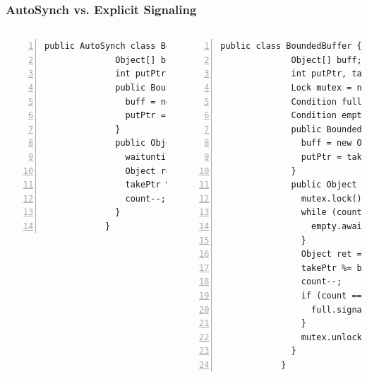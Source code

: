 \documentclass[mathserif,14pt,xcolor=table]{beamer}
\begin{document}
\begin{frame}[fragile]
    \frametitle{AutoSynch vs. Explicit Signaling}

    \begin{columns}
        \begin{lstlisting}[style=tinybase, gobble=8, numbers=left,
            numbersep=-10pt]
            public AutoSynch class BoundedBuffer {
              Object[] buff;
              int putPtr, takePtr, count;
              public BoundedBuffer(int n) {
                buff = new Object[n];
                putPtr = takePtr = count = 0 ;
              }
              public Object take() {
                waituntil (count > 0);
                Object ret = buff[takePtr++];
                takePtr %= buff.length;
                count--;
              }
            }
        \end{lstlisting}
        \begin{lstlisting}[style=tinybase, gobble=8, numbers=left,
            numbersep=-10pt]
            public class BoundedBuffer {
              Object[] buff;
              int putPtr, takePtr, count;
              Lock mutex = new ReentrantLock();
              Condition full = mutex.newCondition();
              Condition empty = mutex.newCondition();
              public BoundedBuffer(int n) {
                buff = new Object[n];
                putPtr = takePtr = count = 0;
              }
              public Object take() {
                mutex.lock();
                while (count == 0) {
                  empty.await();
                }
                Object ret = buff[takePtr++];
                takePtr %= buff.length;
                count--;
                if (count == buff.length - 1) {
                  full.signalAll();
                }
                mutex.unlock();
              }
            }
        \end{lstlisting}
    \end{columns}
\end{frame}

\end{document}
